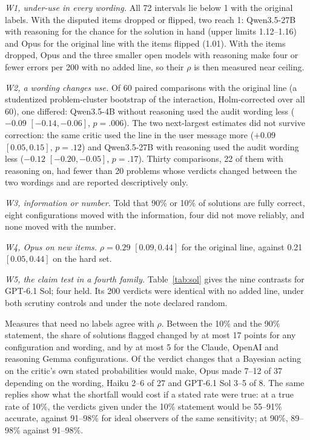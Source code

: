 \documentclass[letterpaper]{article} %
\begin{document}
\emph{W1, under-use in every wording.} All 72 intervals lie below 1 with the original labels. With the disputed items dropped or flipped, two reach 1: Qwen3.5-27B with reasoning for the chance for the solution in hand (upper limits 1.12--1.16) and Opus for the original line with the items flipped (1.01). With the items dropped, Opus and the three smaller open models with reasoning make four or fewer errors per 200 with no added line, so their $\rho$ is then measured near ceiling.

\emph{W2, a wording changes use.} Of 60 paired comparisons with the original line (a studentized problem-cluster bootstrap of the interaction, Holm-corrected over all 60), one differed: Qwen3.5-4B without reasoning used the audit wording less ($-0.09$ $[-0.14, -0.06]$, $p=.006$). The two next-largest estimates did not survive correction: the same critic used the line in the user message more ($+0.09$ $[0.05, 0.15]$, $p=.12$) and Qwen3.5-27B with reasoning used the audit wording less ($-0.12$ $[-0.20, -0.05]$, $p=.17$). Thirty comparisons, 22 of them with reasoning on, had fewer than 20 problems whose verdicts changed between the two wordings and are reported descriptively only.

\emph{W3, information or number.} Told that 90\% or 10\% of solutions are fully correct, eight configurations moved with the information, four did not move reliably, and none moved with the number.

\emph{W4, Opus on new items.} $\rho=0.29$ $[0.09, 0.44]$ for the original line, against 0.21 $[0.05, 0.44]$ on the hard set.

\emph{W5, the claim test in a fourth family.} Table~\ref{tab:sol} gives the nine contrasts for GPT-6.1 Sol; four held. Its 200 verdicts were identical with no added line, under both scrutiny controls and under the note declared random.

Measures that need no labels agree with $\rho$. Between the 10\% and the 90\% statement, the share of solutions flagged changed by at most 17 points for any configuration and wording, and by at most 5 for the Claude, OpenAI and reasoning Gemma configurations. Of the verdict changes that a Bayesian acting on the critic's own stated probabilities would make, Opus made 7--12 of 37 depending on the wording, Haiku 2--6 of 27 and GPT-6.1 Sol 3--5 of 8. The same replies show what the shortfall would cost if a stated rate were true: at a true rate of 10\%, the verdicts given under the 10\% statement would be 55--91\% accurate, against 91--98\% for ideal observers of the same sensitivity; at 90\%, 89--98\% against 91--98\%.
\end{document}
